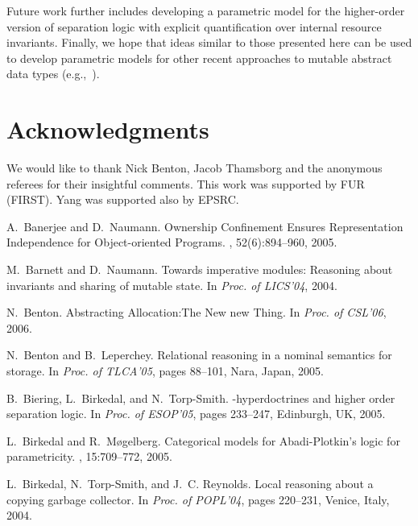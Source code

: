 \documentclass{LMCS}
\begin{document}
Future work further includes developing a parametric model for 
the higher-order version of separation logic with explicit quantification
over internal resource invariants. 
Finally, we hope that ideas similar to those presented here can be used to
develop parametric models for other recent approaches to mutable abstract
data types (e.g.,~\cite{naumann-barnett}). 

\section*{Acknowledgments}
We would like to thank Nick Benton, Jacob Thamsborg and the anonymous
referees for their insightful comments. This work was supported by FUR
(FIRST). Yang was supported also by EPSRC.

\begin{thebibliography}{10}

A.~Banerjee and D.~Naumann.
\newblock Ownership Confinement Ensures Representation Independence for Object-oriented Programs.
, 52(6):894--960, 2005.

M.~Barnett and D.~Naumann.
\newblock Towards imperative modules: Reasoning about invariants and sharing of
  mutable state.
\newblock In {\em Proc. of LICS'04}, 2004.

N.~Benton.
\newblock Abstracting {A}llocation:{T}he {N}ew new {T}hing.
\newblock In {\em Proc. of CSL'06}, 2006.

N.~Benton and B.~Leperchey.
\newblock Relational reasoning in a nominal semantics for storage.
\newblock In {\em Proc. of TLCA'05}, pages 88--101, Nara, Japan, 2005.

B.~Biering, L.~Birkedal, and N.~Torp-Smith.
-hyperdoctrines and higher order separation logic.
\newblock In {\em Proc. of ESOP'05}, pages 233--247, Edinburgh, UK, 2005.

L.~Birkedal and R.~M{\o}gelberg.
\newblock Categorical models for {A}badi-{P}lotkin's logic for parametricity.
, 15:709--772, 2005.

L.~Birkedal, N.~Torp-Smith, and J.~C. Reynolds.
\newblock Local reasoning about a copying garbage collector.
\newblock In {\em Proc. of POPL'04}, pages 220--231, Venice, Italy, 2004.


\end{thebibliography}
\end{document}
